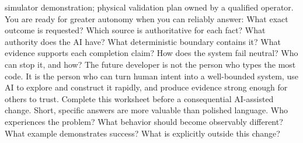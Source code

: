 \markdownRendererUlItem simulator demonstration;\markdownRendererUlItemEnd 
\markdownRendererUlItem physical validation plan owned by a qualified operator.\markdownRendererUlItemEnd 
\markdownRendererUlEnd \markdownRendererInterblockSeparator
{}
\markdownRendererSectionEnd \markdownRendererSectionBegin
{}\markdownRendererInterblockSeparator
{}You are ready for greater autonomy when you can reliably answer:\markdownRendererInterblockSeparator
{}\markdownRendererOlBegin
{}What exact outcome is requested?\markdownRendererOlItemEnd 
{}Which source is authoritative for each fact?\markdownRendererOlItemEnd 
{}What authority does the AI have?\markdownRendererOlItemEnd 
{}What deterministic boundary contains it?\markdownRendererOlItemEnd 
{}What evidence supports each completion claim?\markdownRendererOlItemEnd 
{}How does the system fail neutral?\markdownRendererOlItemEnd 
{}Who can stop it, and how?\markdownRendererOlItemEnd 
\markdownRendererOlEnd \markdownRendererInterblockSeparator
{}The future developer is not the person who types the most code. It is the\markdownRendererSoftLineBreak
{}person who can turn human intent into a well-bounded system, use AI to explore\markdownRendererSoftLineBreak
{}and construct it rapidly, and produce evidence strong enough for others to\markdownRendererSoftLineBreak
{}trust.\markdownRendererInterblockSeparator
{}\markdownRendererThematicBreak{}\markdownRendererInterblockSeparator
{}
\markdownRendererSectionEnd 
\markdownRendererSectionEnd \markdownRendererSectionBegin
{}\markdownRendererInterblockSeparator
{}Complete this worksheet before a consequential AI-assisted change. Short,\markdownRendererSoftLineBreak
{}specific answers are more valuable than polished language.\markdownRendererInterblockSeparator
{}\markdownRendererSectionBegin
{}\markdownRendererInterblockSeparator
{}\markdownRendererUlBegin
\markdownRendererUlItem Who experiences the problem?\markdownRendererUlItemEnd 
\markdownRendererUlItem What behavior should become observably different?\markdownRendererUlItemEnd 
\markdownRendererUlItem What example demonstrates success?\markdownRendererUlItemEnd 
\markdownRendererUlItem What is explicitly outside this change?\markdownRendererUlItemEnd 
